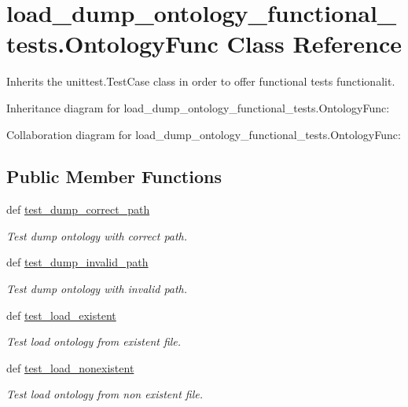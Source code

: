 \hypertarget{classload__dump__ontology__functional__tests_1_1OntologyFunc}{\section{load\-\_\-dump\-\_\-ontology\-\_\-functional\-\_\-tests.\-Ontology\-Func Class Reference}
\label{classload__dump__ontology__functional__tests_1_1OntologyFunc}
}


Inherits the unittest.\-Test\-Case class in order to offer functional tests functionalit.  




Inheritance diagram for load\-\_\-dump\-\_\-ontology\-\_\-functional\-\_\-tests.\-Ontology\-Func\-:


Collaboration diagram for load\-\_\-dump\-\_\-ontology\-\_\-functional\-\_\-tests.\-Ontology\-Func\-:
\subsection*{Public Member Functions}
\begin{DoxyCompactItemize}
\item 
def \hyperlink{classload__dump__ontology__functional__tests_1_1OntologyFunc_ad50d52bac563582e9052c61a9a9d5196}{test\-\_\-dump\-\_\-correct\-\_\-path}
\begin{DoxyCompactList}\small\item\em Test dump ontology with correct path. \end{DoxyCompactList}\item 
def \hyperlink{classload__dump__ontology__functional__tests_1_1OntologyFunc_a208ccc161865a0fc32bfc3c1af7d27a0}{test\-\_\-dump\-\_\-invalid\-\_\-path}
\begin{DoxyCompactList}\small\item\em Test dump ontology with invalid path. \end{DoxyCompactList}\item 
def \hyperlink{classload__dump__ontology__functional__tests_1_1OntologyFunc_a598f0f8220f6d038667c0ab4f29ed851}{test\-\_\-load\-\_\-existent}
\begin{DoxyCompactList}\small\item\em Test load ontology from existent file. \end{DoxyCompactList}\item 
def \hyperlink{classload__dump__ontology__functional__tests_1_1OntologyFunc_a8642dbfe9f5b4b7ebd0a4ab5b52c605c}{test\-\_\-load\-\_\-nonexistent}
\begin{DoxyCompactList}\small\item\em Test load ontology from non existent file. \end{DoxyCompactList}\end{DoxyCompactItemize}



